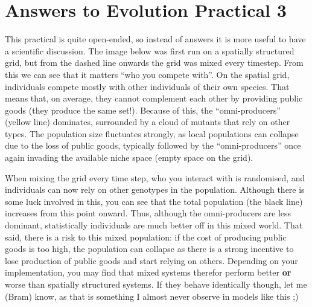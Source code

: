 \documentclass[
  letterpaper,
  DIV=11,
  numbers=noendperiod]{scrreprt}
\theoremstyle{definition}
\theoremstyle{remark}
\begin{document}
\section{Answers to Evolution Practical
3}\label{answers-to-evolution-practical-3}

This practical is quite open-ended, so instead of answers it is more
useful to have a scientific discussion. The image below was first run on
a spatially structured grid, but from the dashed line onwards the grid
was mixed every timestep. From this we can see that it matters ``who you
compete with''. On the spatial grid, individuals compete mostly with
other individuals of their own species. That means that, on average,
they cannot complement each other by providing public goods (they
produce the same set!). Because of this, the ``omni-producers'' (yellow
line) dominates, surrounded by a cloud of mutants that rely on other
types. The population size fluctuates strongly, as local populations can
collapse due to the loss of public goods, typically followed by the
``omni-producers'' once again invading the available niche space (empty
space on the grid).

When mixing the grid every time step, who you interact with is
randomised, and individuals can now rely on other genotypes in the
population. Although there is some luck involved in this, you can see
that the total population (the black line) increases from this point
onward. Thus, although the omni-producers are less dominant,
statistically individuals are much better off in this mixed world. That
said, there is a risk to this mixed population: if the cost of producing
public goods is too high, the population can collapse as there is a
strong incentive to lose production of public goods and start relying on
others. Depending on your implementation, you may find that mixed
systems therefor perform better \textbf{or} worse than spatially
structured systems. If they behave identically though, let me (Bram)
know, as that is something I almost never observe in models like this ;)
\end{document}
